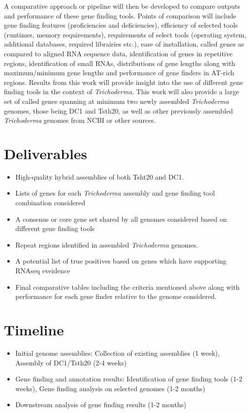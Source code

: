 \documentclass[12pt]{article}
\begin{document}
A comparative approach or pipeline will then be developed to compare
outputs and performance of these gene finding tools. Points of
comparison will include gene finding features (proficiencies and
deficiencies), efficiency of selected tools (runtimes, memory
requirements), requirements of select tools (operating system,
additional databases, required librairies etc.), ease of installation,
called genes as compared to aligned RNA sequence data, identification
of genes in repetitive regions, identification of small RNAs,
distributions of gene lengths along with maximum/minimum gene lengths
and performance of gene finders in AT-rich regions. Results from this
work will provide insight into the use of different gene finding tools
in the context of \textit{Trichoderma}. This work will also provide a
large set of called genes spanning at minimum two newly assembled
\textit{Trichoderma} genomes, those being DC1 and Tsth20, as well as
other previously assembled \textit{Trichoderma} genomes from NCBI or
other sources.

\section{Deliverables}
\begin{itemize}
\item High-quality hybrid assemblies of both Tsht20 and DC1.
\item Lists of genes for each \textit{Trichoderma} assembly and gene
  finding tool combination considered
\item A consenus or core gene set shared by all genomes considered
  based on different gene finding tools
\item Repeat regions identified in assembled \textit{Trichoderma}
  genomes.
\item A potential list of true positives based on genes which have
  supporting RNAseq eveidence
\item Final comparative tables including the criteria mentioned above
  along with performance for each gene finder relative to the genome
  considered.
\end{itemize}

\section{Timeline}
\begin{itemize}
\item Initial genome assemblies: Collection of existing assemblies (1 week), Assembly of DC1/Tsth20 (2-4 weeks)
\item Gene finding and annotation results: Identification of gene finding tools (1-2 weeks), Gene finding analysis on selected genomes (1-2 months)
\item Downstream analysis of gene finding results (1-2 months)
\end{itemize}
\end{document}
